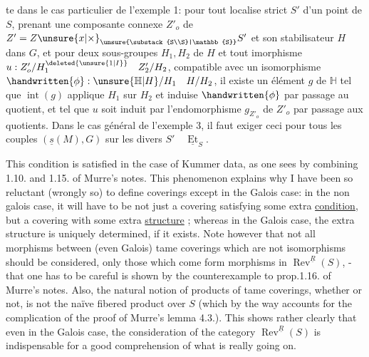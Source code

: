 
te dans le cas particulier de l'exemple 1: pour tout localise strict $S'$ d'un point de $S$, prenant une composante connexe $Z'_o$ de $Z'=Z\unsure{x|\times}_{\unsure{\substack{S\\S}|\mathbb{S}}}S'$ et son stabilisateur $H$ dans $G$, et pour deux sous-groupes  $H_1,H_2$ de $H$ et tout imorphisme $u:Z'_o/H_1^{\deleted{\unsure{1|I}}}\quad Z'_2/H_2$,  compatible avec un isomorphisme $\handwritten{\phi}:\unsure{\mathbb{H}|H}/H_1\quad H/H_2$, il existe un élément $g$ de $\mathbb{H}$ tel que $\operatorname{int}(g)$ applique $H_1$ sur $H_2$ et induise $\handwritten{\phi}$ par passage au quotient, et tel que $u$ soit induit par l'endomorphisme $g_{Z'_o}$ de $Z'_o$ par passage aux quotients. Dans le cas général de l'exemple 3, il faut exiger ceci pour tous les couples $(\underline{s}(M),G)$ sur les divers $S'\quad\underline{\operatorname{Et}}_S$.

This condition is satisfied in the case of Kummer data, as one sees by combining 1.10. and 1.15. of Murre's notes. This phenomenon explains why I have been so reluctant (wrongly so) to define  coverings except in the Galois case: in the non galois case, it will have to be not just a covering satisfying some extra \uline{condition}, but a covering with some extra \uline{structure} ; whereas in the Galois case, the extra structure is uniquely determined, if it exists. Note however that  not all morphisms  between (even Galois) tame coverings which are not isomorphisms should be considered, only those which come form morphisms in $\operatorname{Rev}^{\underline{R}}(S)$, - that one has to be careful is shown by the counterexample to prop.1.16. of Murre's notes. Also, the natural notion of products of tame  coverings, whether  or not, is not the naïve fibered product over $S$ (which by the way accounts for the complication of the proof of Murre's lemma 4.3.). This shows rather clearly that even in the Galois case, the consideration of the category $\operatorname{Rev}^{\underline{R}}(S)$ is indispensable for a good comprehension of what is really going on.
